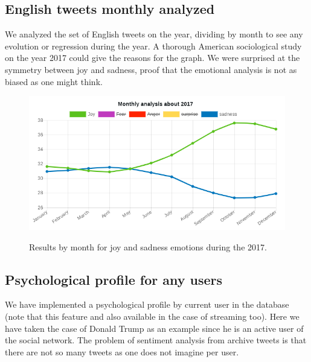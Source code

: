 \documentclass{acmtog} %
\begin{document}
\subsection{English tweets monthly analyzed}
\label{subsub:english_tweets_monthly}

We analyzed the set of English tweets on the year, dividing by month to see any evolution or regression during the year. A thorough American sociological study on the year 2017 could give the reasons for the graph. We were surprised at the symmetry between joy and sadness, proof that the emotional analysis is not as biased as one might think. 


\begin{figure}[h!]
{\includegraphics[width=\linewidth]{monthly_analysis_joy_sadness-exemple.png}}
\caption{Results by month for joy and sadness emotions during the 2017.}
  \label{fig:trump_results}
\end{figure}




\subsection{Psychological profile for any users}
\label{subsub:psychological_profile}

We have implemented a psychological profile by current user in the database (note that this feature and also available in the case of streaming too). Here we have taken the case of Donald Trump as an example since he is an active user of the social network.
The problem of sentiment analysis from archive tweets is that there are not so many tweets as one does not imagine per user.
\end{document}
